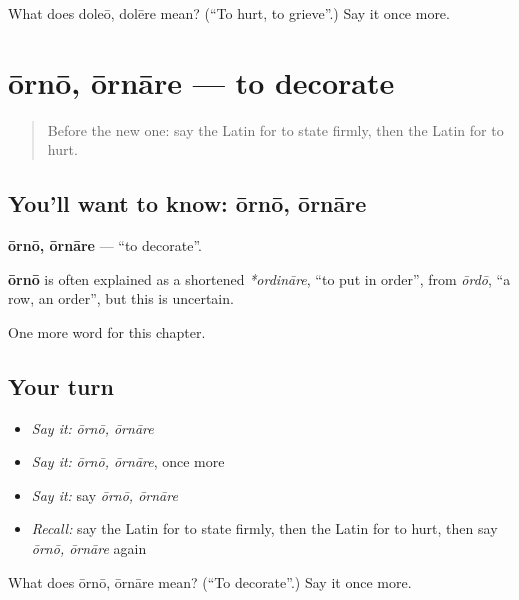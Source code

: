 \begin{tcolorbox}[breakable,colback=teal!4,colframe=teal!35!black,title={Before you move on}]
What does doleō, dolēre mean? (\textquotedblleft{}To hurt, to grieve\textquotedblright{}.) Say it once more.
\end{tcolorbox}
\section[ōrnō, ōrnāre]{ōrnō, ōrnāre — to decorate}

\label{lesson:LA-C204-orno}



\begin{quote}
Before the new one: say the Latin for to state firmly, then the Latin for to hurt.
\end{quote}

\subsection*{You'll want to know: ōrnō, ōrnāre}
\textbf{ōrnō, ōrnāre} — \textquotedblleft{}to decorate\textquotedblright{}.

\begin{cousinweb}
\textbf{ōrnō} is often explained as a shortened \emph{*ordināre}, \textquotedblleft{}to put in order\textquotedblright{}, from \emph{ōrdō}, \textquotedblleft{}a row, an order\textquotedblright{}, but this is uncertain.
\end{cousinweb}

\begin{grammarlens}[title={What you've built}]
One more word for this chapter.
\end{grammarlens}

\subsection*{Your turn}
\begin{itemize}
\raggedright
  \item \emph{Say it:} \emph{ōrnō, ōrnāre}
  \item \emph{Say it:} \emph{ōrnō, ōrnāre}, once more
  \item \emph{Say it:} say \emph{ōrnō, ōrnāre}
  \item \emph{Recall:} say the Latin for to state firmly, then the Latin for to hurt, then say \emph{ōrnō, ōrnāre} again
\end{itemize}

\begin{tcolorbox}[breakable,colback=teal!4,colframe=teal!35!black,title={Before you move on}]
What does ōrnō, ōrnāre mean? (\textquotedblleft{}To decorate\textquotedblright{}.) Say it once more.
\end{tcolorbox}
